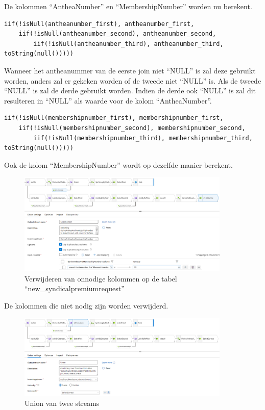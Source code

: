 De kolommen ``AntheaNumber'' en ``MembershipNumber'' worden nu berekent.

\begin{verbatim}
iif(!isNull(antheanumber_first), antheanumber_first,      
    iif(!isNull(antheanumber_second), antheanumber_second,
        iif(!isNull(antheanumber_third), antheanumber_third, toString(null()))))
\end{verbatim}

Wanneer het antheanummer van de eerste join niet ``NULL'' is zal deze gebruikt worden, anders zal er gekeken worden of de tweede niet ``NULL'' is. Als de tweede ``NULL'' is zal de derde gebruikt worden. Indien de derde ook ``NULL'' is zal dit resulteren in ``NULL'' als waarde voor de kolom ``AntheaNumber''.

\begin{verbatim}
iif(!isNull(membershipnumber_first), membershipnumber_first, 
    iif(!isNull(membershipnumber_second), membershipnumber_second,         
        iif(!isNull(membershipnumber_third), membershipnumber_third, toString(null()))))
\end{verbatim}

Ook de kolom ``MembershipNumber'' wordt op dezelfde manier berekent.

\begin{figure}[H]
    \centering
    \includegraphics[width=0.9\textwidth]{./graphics/adf/member_8.png}
    \caption{Verwijderen van onnodige kolommen op de tabel ``new\_syndicalpremiumrequest''}
\end{figure}

De kolommen die niet nodig zijn worden verwijderd.

\begin{figure}[H]
    \includegraphics[width=0.9\textwidth]{./graphics/adf/member_9.png}
    \caption{Union van twee streams}
\end{figure}

